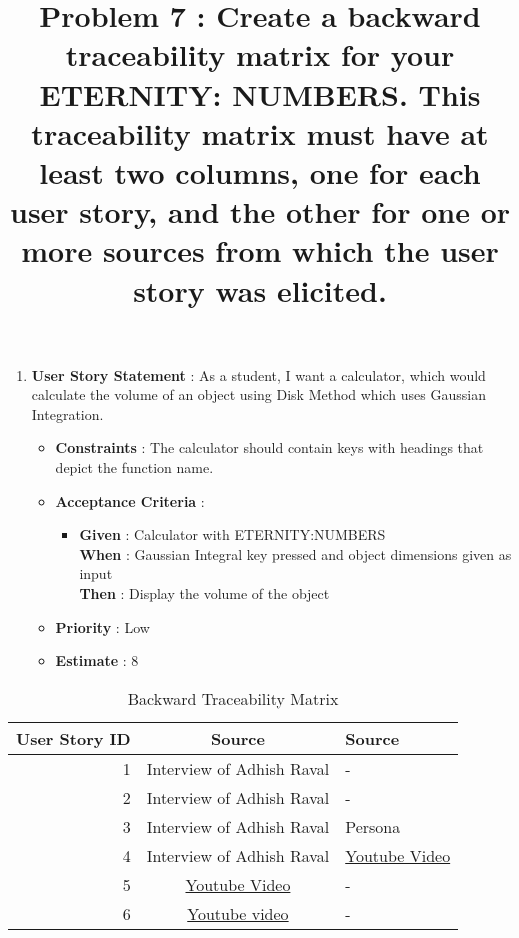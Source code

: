 \documentclass{article}
\begin{document}
\begin{enumerate}
        \item \textbf{User Story Statement} : As a student, I want a calculator, which would calculate the volume of an object using Disk Method which uses Gaussian Integration.
    \begin{itemize}
        \item \textbf{Constraints} : The calculator should contain keys with headings that depict the function name. 
        \item \textbf{Acceptance Criteria} : 
            \begin{itemize}
                \item \textbf{Given} : Calculator with ETERNITY:NUMBERS \\
                \textbf{When} : Gaussian Integral key pressed and object dimensions given as input\\
                \textbf{Then} : Display the volume of the object
            \end{itemize}
        \item \textbf{Priority} : Low
        \item \textbf{Estimate} : 8
    \end{itemize}
\end{enumerate}

\newpage

\title{\textbf{Problem 7 : Create   a   backward   traceability   matrix   for   your   ETERNITY:  NUMBERS.   This   traceability matrix must have at least two columns, one for each user story, and the other for one or more sources from which the user story was elicited.  }}

\maketitle
\newpage \hfill\break

\begin{table}[h]
\begin{center}
\begin{tabular}{|r|c|l|}
\hline 
\textbf{User Story ID} & \textbf{Source} & \textbf{Source}\\ 
\hline
1 & Interview of Adhish Raval & -\\ \hline
2 & Interview of Adhish Raval & -\\ \hline
3 & Interview of Adhish Raval & Persona\\ \hline
4 & Interview of Adhish Raval & \href {https://www.youtube.com/watch?v=tGn9EBnMKJchref}{Youtube Video} \\ \hline
5 & \href{https://www.youtube.com/watch?v=WeLXe0jH24s}{Youtube Video} & -\\ \hline
6 & \hyperlink {https://www.khanacademy.org/math/ap-calculus-ab/ab-applications-of-integration-new/ab-8-9/v/disk-method-around-x-axis}{Youtube video} &  - \\ \hline
\end{tabular}
\caption{\label{table:one}Backward Traceability Matrix}
\end{center}
\end{table}
\end{document}
